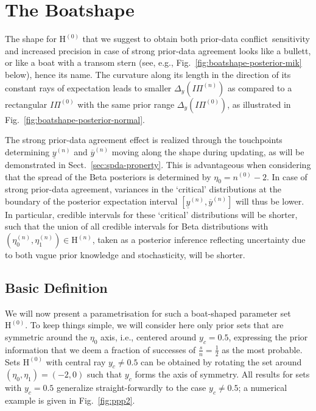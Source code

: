 \documentclass[runningheads,a4paper]{llncs}
\def\pdc{prior-data conflict}
\newcommand{\uz}{^{(0)}} %
\newcommand{\un}{^{(n)}} %
\newcommand{\ul}[1]{\underline{#1}}
\newcommand{\ol}[1]{\overline{#1}}
\def\ynl{\ul{y}\un}
\def\ynu{\ol{y}\un}
\def\nz{n\uz}
\def\PZ{I\!\!\Pi\uz}
\def\PN{I\!\!\Pi\un}
\def\EZ{\mathrm{H}\uz}
\def\EN{\mathrm{H}\un}
\def\ezn{\eta_0\un}
\def\eon{\eta_1\un}
\begin{document}
\section{The Boatshape}
\label{sec:boatshape}

The shape for $\EZ$ that we suggest to obtain both \pdc\ sensitivity and increased precision
in case of strong prior-data agreement looks like a bullett, or like a boat with a transom stern
(see, e.g., Fig.~\ref{fig:boatshape-posterior-mik} below), hence its name.
The curvature along its length in the direction of its constant rays of expectation
leads to smaller $\Delta_y(\PN)$ as compared to a rectangular $\PZ$ with the same prior range $\Delta_y(\PZ)$,
as illustrated in Fig.~\ref{fig:boatshape-posterior-normal}.

The strong prior-data agreement effect is realized
through the touchpoints determining $\ynl$ and $\ynu$
moving along the shape during updating,
as will be demonstrated in Sect.~\ref{sec:spda-property}.
This is advantageous when considering that the spread of the Beta posteriors is determined by $\eta_0 = \nz - 2$.
In case of strong prior-data agreement, variances in the `critical' distributions
at the boundary of the posterior expectation interval $[\ynl,\ynu]$ will thus be lower.
In particular, credible intervals for these `critical' distributions will be shorter, 
such that the union of all credible intervals for Beta distributions with $(\ezn, \eon) \in \EN$,
taken as a posterior inference reflecting uncertainty due to both vague prior knowledge and stochasticity, will be shorter.
%


\subsection{Basic Definition}
\label{sec:basicdefboat}

We will now present a parametrisation for such a boat-shaped parameter set $\EZ$.
To keep things simple, we will consider here only prior sets
that are symmetric around the $\eta_0$ axis, i.e., centered around $y_c = 0.5$,
expressing the prior information that we deem a fraction of successes of $\frac{s}{n} = \frac{1}{2}$ as the most probable.
Sets $\EZ$ with central ray $y_c \neq 0.5$ can be obtained
by rotating the set around $(\eta_0, \eta_1) = (-2,0)$ such that $y_c$ forms the axis of symmetry.
All results for sets with $y_c = 0.5$ generalize straight-forwardly to the case $y_c \neq 0.5$;
a numerical example is given in Fig.~\ref{fig:ppp2}.
\end{document}
